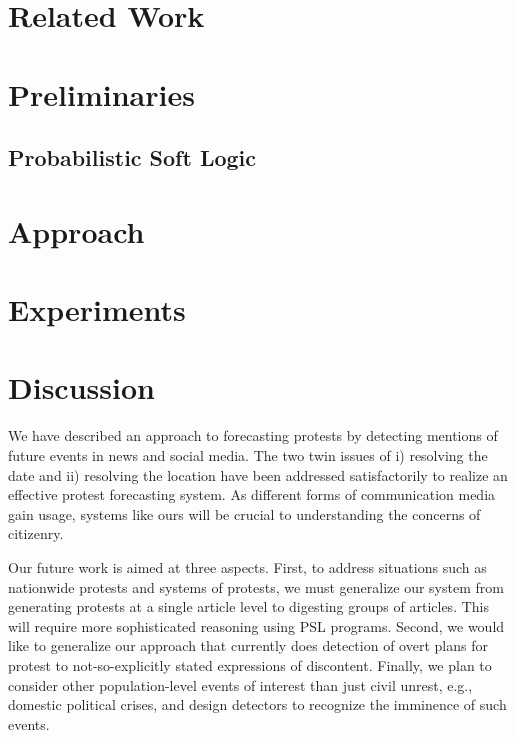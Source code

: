 \documentclass[12pt]{report}
\begin{document}
%
\chapter{Related Work}


\chapter{Preliminaries}


\section{Probabilistic Soft Logic}

\label{section:PSL}

\chapter{Approach}


\chapter{Experiments}


\chapter{Discussion}
We have described an approach to forecasting protests by detecting mentions of future events in news and social
media. The two twin issues of i) resolving the date and ii) resolving the location have been addressed satisfactorily
to realize an effective protest forecasting system. As different forms of communication media gain usage, systems
like ours will be crucial to understanding the concerns of citizenry.

Our future work is aimed at three aspects. First, to address situations such as nationwide protests and systems of protests,
we must generalize our system from generating protests at a single article level to digesting groups of articles. This will
require more sophisticated reasoning using PSL programs. 
Second, we would like to generalize our approach that currently
does detection of overt plans for protest to not-so-explicitly stated expressions of discontent. 
Finally, we plan to consider other population-level events of interest than just civil unrest, e.g., domestic political crises,
and design detectors to recognize the imminence of such events.




\cleardoublepage
{}


\end{document}
